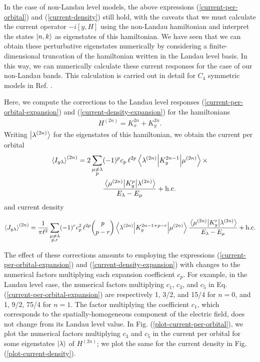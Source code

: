\documentclass[aps,prb,twocolumn,letterpaper,twoside,nobalancelastpage,groupedaddress,amsmath,amssymb,floatfix,citeautoscript]{revtex4-1}
\begin{document}
In the case of non-Landau level models, the above expressions (\ref{current-per-orbital}) and (\ref{current-density}) still hold, with the caveats that we must calculate the current operator $-i[y,H]$ using the non-Landau hamiltonian and interpret the states $\ket{n,k}$ as eigenstates of this hamiltonian. We have seen that we can obtain these perturbative eigenstates numerically by considering a finite-dimensional truncation of the hamiltonian written in the Landau level basis. In this way, we can numerically calculate these current responses for the case of our non-Landau bands. This calculation is carried out in detail for $C_4$ symmetric models in Ref. .

Here, we compute the corrections to the Landau level responses (\ref{current-per-orbital-expansion}) and (\ref{current-density-expansion}) for the hamiltonians
\begin{align*}
H^{(2n)} = K_x^{2n} + K_y^{2n}.
\end{align*}
Writing $\ket{\lambda^{(2n)}}$ for the eigenstates of this hamiltonian, we obtain the current per orbital
\begin{align*}
\expval{I_{y\lambda}}^{(2n)} = 2\sum_{\substack{\mu\neq\lambda\\p}}&(-1)^pc_p\,\ell^{2p} \mel{\lambda^{(2n)}}{K_y^{2n-1}}{\mu^{(2n)}}\times\\&\frac{\mel{\mu^{(2n)}}{K_y^p}{\lambda^{(2n)}}}{E_{\lambda}-E_{\mu}} + \text{h.c.}
\end{align*}
and current density
\begin{widetext}
\begin{align*}
\expval{J_{y\lambda}}^{(2n)} = \frac{1}{\pi \ell^2}\sum_{\substack{\mu\neq\lambda\\p,r}} (-1)^{r} c_p^2\,\ell^{2p} \binom{p}{p-r}\mel{\lambda^{(2n)}}{K_y^{2n-1+p-r}}{\mu^{(2n)}}\frac{\mel{\mu^{(2n)}}{K_y^r}{\lambda^{(2n)}}}{E_{\lambda}-E_{\mu}} + \text{h.c.}
\end{align*}
\end{widetext}

The effect of these corrections amounts to employing the expressions (\ref{current-per-orbital-expansion}) and (\ref{current-density-expansion}) with changes to the numerical factors multiplying each expansion coefficient $c_p$. For example, in the Landau level case, the numerical factors multiplying $c_1$, $c_3$, and $c_5$ in Eq. (\ref{current-per-orbital-expansion}) are respectively 1, 3/2, and 15/4 for $n=0$, and 1, 9/2, 75/4 for $n=1$. The factor multiplying the coefficient $c_1$, which corresponds to the spatially-homogeneous component of the electric field, does not change from its Landau level value. In Fig. (\ref{plot-current-per-orbital}), we plot the numerical factors multiplying $c_3$ and $c_5$ in the current per orbital for some eigenstates $\ket{\lambda}$ of $H^{(2n)}$; we plot the same for the current density in Fig. (\ref{plot-current-density}).
\end{document}
